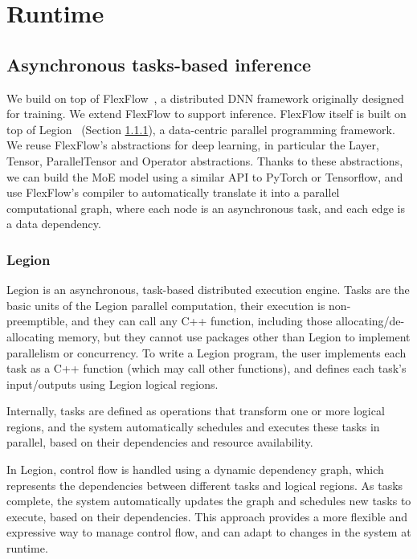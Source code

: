 
\chapter{\Project Runtime}\label{chapter-4}

\section{Asynchronous tasks-based inference}
We build \Project on top of FlexFlow~\cite{flexflow,unity}, a distributed DNN framework originally designed for training. We extend FlexFlow to support inference. FlexFlow itself is built on top of Legion~\cite{legion} (Section \ref{legion}), a data-centric parallel programming framework. We reuse FlexFlow's abstractions for deep learning, in particular the Layer, Tensor, ParallelTensor and Operator abstractions. Thanks to these abstractions, we can build the MoE model using a similar API to PyTorch or Tensorflow, and use FlexFlow's compiler to automatically translate it into a parallel computational graph, where each node is an asynchronous task, and each edge is a data dependency. 

\subsection{Legion}\label{legion}
Legion is an asynchronous, task-based distributed execution engine. Tasks are the basic units of the Legion parallel computation, their execution is non-preemptible, and they can call any C++ function, including those allocating/de-allocating memory, but they cannot use packages other than Legion to implement parallelism or concurrency. To write a Legion program, the user implements each task as a C++ function (which may call other functions), and defines each task's input/outputs using Legion logical regions. 

Internally, tasks are defined as operations that transform one or more logical regions, and the system automatically schedules and executes these tasks in parallel, based on their dependencies and resource availability. 

In Legion, control flow is handled using a dynamic dependency graph, which represents the dependencies between different tasks and logical regions. As tasks complete, the system automatically updates the graph and schedules new tasks to execute, based on their dependencies. This approach provides a more flexible and expressive way to manage control flow, and can adapt to changes in the system at runtime.

